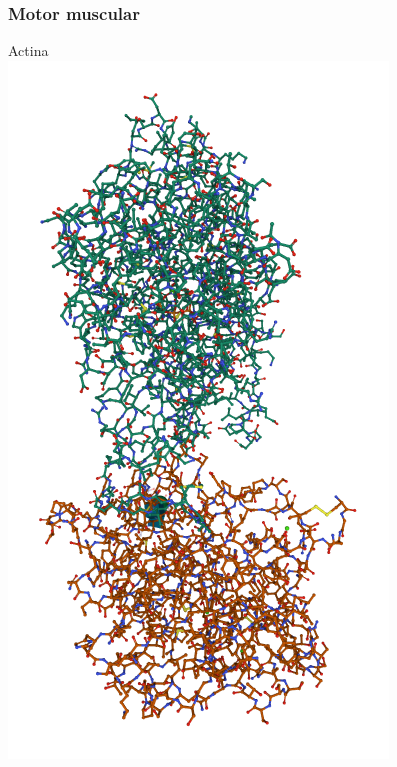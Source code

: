 \documentclass[10pt]{beamer}
\theoremstyle{plain}
\theoremstyle{definition}
\begin{document}
	\begin{frame}
		\frametitle{\normalsize Motor muscular } 
		{
			\small
			
			\begin{center}
				\begin{minipage}{0.08\linewidth}
					\hspace{0.1cm}
				\end{minipage}	
				\begin{minipage}{0.3\linewidth}
					\centering Actina\\
					\includegraphics[width=1\linewidth]{1ATN.png}

\end{minipage}
\end{center}}
\end{frame}
\end{document}
